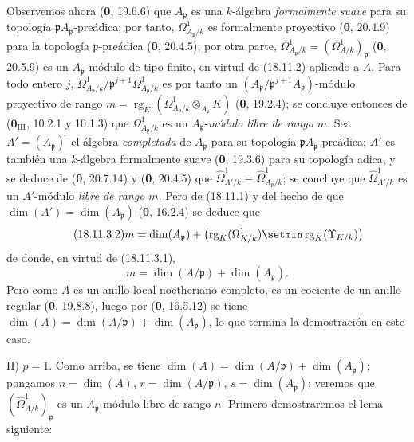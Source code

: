 Observemos ahora (\textbf 0, 19.6.6) que $A_{\mathfrak p}$ es una $k$-álgebra \emph{formalmente suave} para su topología $\mathfrak pA_{\mathfrak p}$-preádica; por tanto, $\Omega^1_{A_{\mathfrak p}/k}$ es formalmente proyectivo (\textbf 0, 20.4.9) para la topología $\mathfrak p$-preádica (\textbf 0, 20.4.5); por otra parte, $\Omega^1_{A_{\mathfrak p}/k}=(\Omega^1_{A/k})_{\mathfrak p}$ (\textbf 0, 20.5.9) es un $A_{\mathfrak p}$-módulo de tipo finito, en virtud de (18.11.2) aplicado a $A$. Para todo entero $j$, $\Omega^1_{A_{\mathfrak p}/k}/\mathfrak p^{j+1}\Omega^1_{A_{\mathfrak p}/k}$ es por tanto un $(A_{\mathfrak p}/\mathfrak p^{j+1}A_{\mathfrak p})$-módulo proyectivo de rango $m=\operatorname{rg}_K(\Omega^1_{A_{\mathfrak p}/k}\otimes_{A_{\mathfrak p}}K)$ (\textbf 0, 19.2.4); se concluye entonces de ($\mathbf{0}_{\mathrm{III}}$, 10.2.1 y 10.1.3) que $\Omega^1_{A_{\mathfrak p}/k}$ es un $A_{\mathfrak p}$-\emph{módulo libre de rango $m$}. Sea $A'=(A_{\mathfrak p})^{\widehat{\,}}$ el álgebra \emph{completada} de $A_{\mathfrak p}$ para su topología $\mathfrak pA_{\mathfrak p}$-preádica; $A'$ es también una $k$-álgebra formalmente suave (\textbf 0, 19.3.6) para su topología adica, y se deduce de (\textbf 0, 20.7.14) y (\textbf 0, 20.4.5) que $\hat{\Omega}^1_{A'/k}=\hat{\Omega}^1_{A_{\mathfrak p}/k}$; se concluye que $\hat{\Omega}^1_{A'/k}$ es un $A'$-módulo \emph{libre de rango $m$}. Pero de (18.11.1) y del hecho de que $\dim(A')=\dim(A_{\mathfrak p})$ (\textbf 0, 16.2.4) se deduce que
\begin{equation}
\label{IV.18.11.3.2}
\tag{18.11.3.2}
  m=\dim(A_{\mathfrak p})+
  \bigl(\operatorname{rg}_K(\Omega^1_{K/k})\setmin\operatorname{rg}_K(\Upsilon_{K/k})\bigr)
\end{equation}
de donde, en virtud de (18.11.3.1),
\[
  m=\dim(A/\mathfrak p)+\dim(A_{\mathfrak p}).
\]
Pero como $A$ es un anillo local noetheriano completo, es un cociente de un anillo regular (\textbf 0, 19.8.8), luego por (\textbf 0, 16.5.12) se tiene $\dim(A)=\dim(A/\mathfrak p)+\dim(A_{\mathfrak p})$, lo que termina la demostración en este caso.

II) $p=1$. Como arriba, se tiene $\dim(A)=\dim(A/\mathfrak p)+\dim(A_{\mathfrak p})$; pongamos $n=\dim(A)$, $r=\dim(A/\mathfrak p)$, $s=\dim(A_{\mathfrak p})$; veremos que $(\hat{\Omega}^1_{A/k})_{\mathfrak p}$ es un $A_{\mathfrak p}$-módulo libre de rango $n$. Primero demostraremos el lema siguiente:

